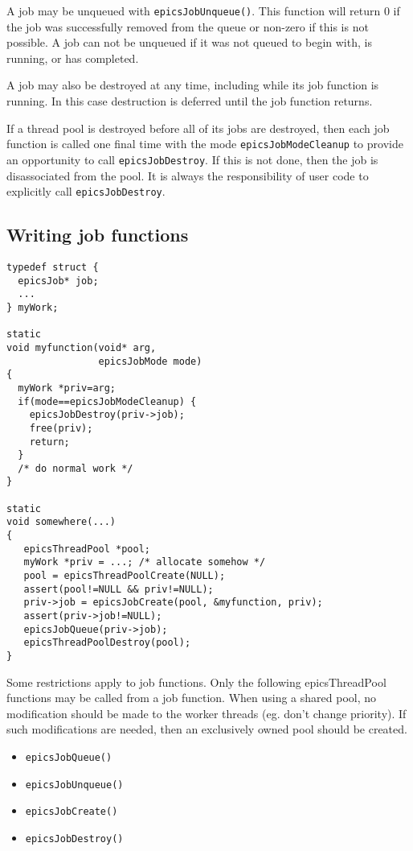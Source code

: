 A job may be unqueued with \verb|epicsJobUnqueue()|. This function will return
0 if the job was successfully removed from the queue or non-zero if this is
not possible. A job can not be unqueued if it was not queued to begin
with, is running, or has completed.

A job may also be destroyed at any time, including while its job function
is running. In this case destruction is deferred until the job function returns.

If a thread pool is destroyed before all of its jobs are destroyed,
then each job function is called one final time with the mode \verb|epicsJobModeCleanup|
to provide an opportunity to call \verb|epicsJobDestroy|.
If this is not done, then the job is disassociated from the pool.
It is always the responsibility of user code to explicitly call \verb|epicsJobDestroy|.

\subsection{Writing job functions}

\begin{verbatim}
typedef struct {
  epicsJob* job;
  ...
} myWork;

static
void myfunction(void* arg,
                epicsJobMode mode)
{
  myWork *priv=arg;
  if(mode==epicsJobModeCleanup) {
    epicsJobDestroy(priv->job);
    free(priv);
    return;
  }
  /* do normal work */
}

static
void somewhere(...)
{
   epicsThreadPool *pool;
   myWork *priv = ...; /* allocate somehow */
   pool = epicsThreadPoolCreate(NULL);
   assert(pool!=NULL && priv!=NULL);
   priv->job = epicsJobCreate(pool, &myfunction, priv);
   assert(priv->job!=NULL);
   epicsJobQueue(priv->job);
   epicsThreadPoolDestroy(pool);
}
\end{verbatim}


Some restrictions apply to job functions. Only the following epicsThreadPool
functions may be called from a job function. When using a shared pool,
no modification should be made to the worker threads (eg. don't change
priority). If such modifications are needed, then an exclusively owned
pool should be created.

\begin{itemize}
\item \verb|epicsJobQueue()|
\item \verb|epicsJobUnqueue()|
\item \verb|epicsJobCreate()|
\item \verb|epicsJobDestroy()|
\end{itemize}

